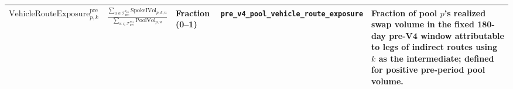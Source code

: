\begin{tabularx}{\linewidth}{@{}>{\raggedright\arraybackslash}X>{\raggedright\arraybackslash}Xl>{\raggedright\arraybackslash}X>{\raggedright\arraybackslash}X@{}}
$\mathrm{VehicleRouteExposure}^{\mathrm{pre}}_{p,k}$ & $\displaystyle\frac{\sum_{u\in\mathcal T^{\mathrm{V4}}_{\mathrm{pre}}}\mathrm{SpokeIVol}_{p,k,u}}{\sum_{u\in\mathcal T^{\mathrm{V4}}_{\mathrm{pre}}}\mathrm{PoolVol}_{p,u}}$ & Fraction (0--1) & \texttt{pre\_\allowbreak{}v4\_\allowbreak{}pool\_\allowbreak{}vehicle\_\allowbreak{}route\_\allowbreak{}exposure} & Fraction of pool $p$'s realized swap volume in the fixed 180-day pre-V4 window attributable to legs of indirect routes using $k$ as the intermediate; defined for positive pre-period pool volume. \\
\bottomrule
\end{tabularx}
\endgroup
